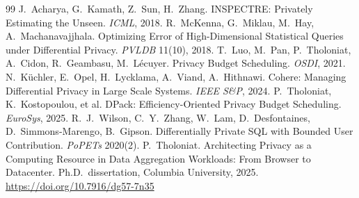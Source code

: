 \documentclass[sigconf,nonacm]{acmart}
\begin{document}
\begin{thebibliography}{99}
 J.\ Acharya, G.\ Kamath, Z.\ Sun, H.\ Zhang. INSPECTRE: Privately Estimating the Unseen. \emph{ICML}, 2018.
 R.\ McKenna, G.\ Miklau, M.\ Hay, A.\ Machanavajjhala. Optimizing Error of High-Dimensional Statistical Queries under Differential Privacy. \emph{PVLDB} 11(10), 2018.
 T.\ Luo, M.\ Pan, P.\ Tholoniat, A.\ Cidon, R.\ Geambasu, M.\ L\'ecuyer. Privacy Budget Scheduling. \emph{OSDI}, 2021.
 N.\ K\"uchler, E.\ Opel, H.\ Lycklama, A.\ Viand, A.\ Hithnawi. Cohere: Managing Differential Privacy in Large Scale Systems. \emph{IEEE S\&P}, 2024.
 P.\ Tholoniat, K.\ Kostopoulou, et al. DPack: Efficiency-Oriented Privacy Budget Scheduling. \emph{EuroSys}, 2025.
 R.\ J.\ Wilson, C.\ Y.\ Zhang, W.\ Lam, D.\ Desfontaines, D.\ Simmons-Marengo, B.\ Gipson. Differentially Private SQL with Bounded User Contribution. \emph{PoPETs} 2020(2).
 P.\ Tholoniat. Architecting Privacy as a Computing Resource in Data Aggregation Workloads: From Browser to Datacenter. Ph.D.\ dissertation, Columbia University, 2025. \url{https://doi.org/10.7916/dg57-7n35}

\end{thebibliography}
\end{document}
